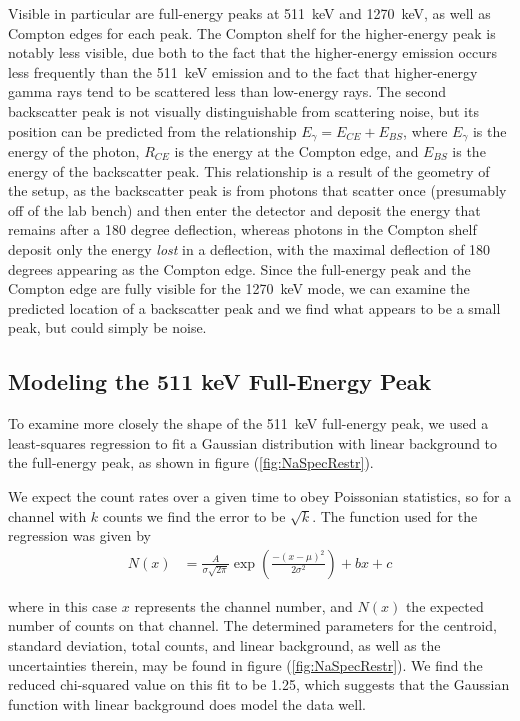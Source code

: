 \documentclass[letter]{article}
\begin{document}
 Visible in particular are full-energy peaks at \qty{511}{\kilo\electronvolt} and \qty{1270}{\kilo\electronvolt}, as well as Compton edges for each peak. The Compton shelf for the higher-energy peak is notably less visible, due both to the fact that the higher-energy emission occurs less frequently than the \qty{511}{\kilo\electronvolt} emission and to the fact that higher-energy gamma rays tend to be scattered less than low-energy rays. The second backscatter peak is not visually distinguishable from scattering noise, but its position can be predicted from the relationship $E_\gamma = E_{CE} + E_{BS}$, where $E_\gamma$ is the energy of the photon, $R_{CE}$ is the energy at the Compton edge, and $E_{BS}$ is the energy of the backscatter peak. This relationship is a result of the geometry of the setup, as the backscatter peak is from photons that scatter once (presumably off of the lab bench) and then enter the detector and deposit the energy that remains after a 180 degree deflection, whereas photons in the Compton shelf deposit only the energy \textit{lost} in a deflection, with the maximal deflection of 180 degrees appearing as the Compton edge. Since the full-energy peak and the Compton edge are fully visible for the \qty{1270}{\kilo\electronvolt} mode, we can examine the predicted location of a backscatter peak and we find what appears to be a small peak, but could simply be noise. 

\subsection{Modeling the 511 keV Full-Energy Peak}

To examine more closely the shape of the \qty{511}{\kilo\electronvolt} full-energy peak, we used a least-squares regression to fit a Gaussian distribution with linear background to the full-energy peak, as shown in figure (\ref{fig:NaSpecRestr}).


We expect the count rates over a given time to obey Poissonian statistics, so for a channel with $k$ counts we find the error to be $\sqrt{k}$. The function used for the regression was given by
\begin{align}
N(x)
&=
\frac{A}{\sigma \sqrt{2 \pi}} \exp \left( \frac{- (x-\mu)^2}{2 \sigma^2} \right) + bx + c
\end{align}

where in this case $x$ represents the channel number, and $N(x)$ the expected number of counts on that channel. The determined parameters for the centroid, standard deviation, total counts, and linear background, as well as the uncertainties therein, may be found in figure (\ref{fig:NaSpecRestr}). We find the reduced chi-squared value on this fit to be 1.25, which suggests that the Gaussian function with linear background does model the data well.
\end{document}
